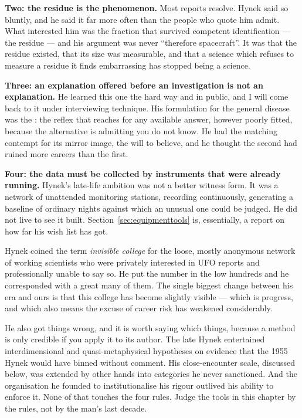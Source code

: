 \textbf{Two: the residue is the phenomenon.} Most reports resolve. Hynek said so bluntly, and he
said it far more often than the people who quote him admit. What interested him was the
fraction that survived competent identification --- the residue --- and his argument was never
``therefore spacecraft''. It was that the residue existed, that its size was measurable, and that
a science which refuses to measure a residue it finds embarrassing has stopped being a science.

\textbf{Three: an explanation offered before an investigation is not an explanation.} He learned
this one the hard way and in public, and I will come back to it under interviewing technique. His
formulation for the general disease was the : the reflex that reaches
for any available answer, however poorly fitted, because the alternative is admitting you do not
know. He had the matching contempt for its mirror image, the will to believe, and he thought the
second had ruined more careers than the first.

\textbf{Four: the data must be collected by instruments that were already running.} Hynek's
late-life ambition was not a better witness form. It was a network of unattended monitoring
stations, recording continuously, generating a baseline of ordinary nights against which an
unusual one could be judged. He did not live to see it built. Section~\ref{sec:equipmenttools}
is, essentially, a report on how far his wish list has got.

\begin{funfact}
Hynek coined the term \emph{invisible college} for the loose, mostly anonymous network of
working scientists who were privately interested in UFO reports and professionally unable to
say so. He put the number in the low hundreds and he corresponded with a great many of them. The
single biggest change between his era and ours is that this college has become slightly visible
--- which is progress, and which also means the excuse of career risk has weakened considerably.
\end{funfact}

He also got things wrong, and it is worth saying which things, because a method is only credible
if you apply it to its author. The late Hynek entertained interdimensional and
quasi-metaphysical hypotheses on evidence that the 1955 Hynek would have binned without comment.
His close-encounter scale, discussed below, was extended by other hands into categories he never
sanctioned. And the organisation he founded to institutionalise his rigour outlived his ability
to enforce it. None of that touches the four rules. Judge the tools in this chapter by the rules,
not by the man's last decade.

